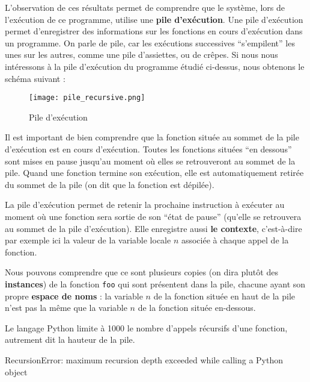 \documentclass[
  a4paper,
  DIV=11,
  numbers=noendperiod]{scrartcl}
\newenvironment{Shaded}{\begin{snugshade}}{\end{snugshade}}
\newcommand{\BuiltInTok}[1]{\textcolor[rgb]{0.00,0.23,0.31}{#1}}
\newcommand{\ControlFlowTok}[1]{\textcolor[rgb]{0.00,0.23,0.31}{#1}}
\newcommand{\NormalTok}[1]{\textcolor[rgb]{0.00,0.23,0.31}{#1}}
\newcommand{\PreprocessorTok}[1]{\textcolor[rgb]{0.68,0.00,0.00}{#1}}
\begin{document}
L'observation de ces résultats permet de comprendre que le système, lors
de l'exécution de ce programme, utilise une \textbf{pile d'exécution}.
Une pile d'exécution permet d'enregistrer des informations sur les
fonctions en cours d'exécution dans un programme. On parle de pile, car
les exécutions successives ``s'empilent'' les unes sur les autres, comme
une pile d'assiettes, ou de crêpes. Si nous nous intéressons à la pile
d'exécution du programme étudié ci-dessus, nous obtenons le schéma
suivant :

\begin{figure}

{\centering \texttt{[image: pile\_recursive.png]}

}

\caption{Pile d'exécution}

\end{figure}

Il est important de bien comprendre que la fonction située au sommet de
la pile d'exécution est en cours d'exécution. Toutes les fonctions
situées ``en dessous'' sont mises en pause jusqu'au moment où elles se
retrouveront au sommet de la pile. Quand une fonction termine son
exécution, elle est automatiquement retirée du sommet de la pile (on dit
que la fonction est dépilée).

La pile d'exécution permet de retenir la prochaine instruction à
exécuter au moment où une fonction sera sortie de son ``état de pause''
(qu'elle se retrouvera au sommet de la pile d'exécution). Elle
enregistre aussi \textbf{le contexte}, c'est-à-dire par exemple ici la
valeur de la variable locale \(n\) associée à chaque appel de la
fonction.

Nous pouvons comprendre que ce sont plusieurs copies (on dira plutôt des
\textbf{instances}) de la fonction \texttt{foo} qui sont présentent dans
la pile, chacune ayant son propre \textbf{espace de noms} : la variable
\(n\) de la fonction située en haut de la pile n'est pas la même que la
variable \(n\) de la fonction située en-dessous.

\begin{tcolorbox}[enhanced jigsaw, colframe=quarto-callout-warning-color-frame, bottomrule=.15mm, breakable, titlerule=0mm, leftrule=.75mm, coltitle=black, toptitle=1mm, opacitybacktitle=0.6, bottomtitle=1mm, arc=.35mm, opacityback=0, title=\textcolor{quarto-callout-warning-color}{\faExclamationTriangle}\hspace{0.5em}{Limitation propre à Python}, left=2mm, rightrule=.15mm, toprule=.15mm, colbacktitle=quarto-callout-warning-color!10!white, colback=white]

Le langage Python limite à 1000 le nombre d'appels récursifs d'une
fonction, autrement dit la hauteur de la pile.

\begin{Shaded}
\begin{Highlighting}[]
\PreprocessorTok{RecursionError}\NormalTok{: maximum recursion depth exceeded }\ControlFlowTok{while}\NormalTok{ calling a Python }\BuiltInTok{object}
\end{Highlighting}
\end{Shaded}

\end{tcolorbox}
\end{document}
